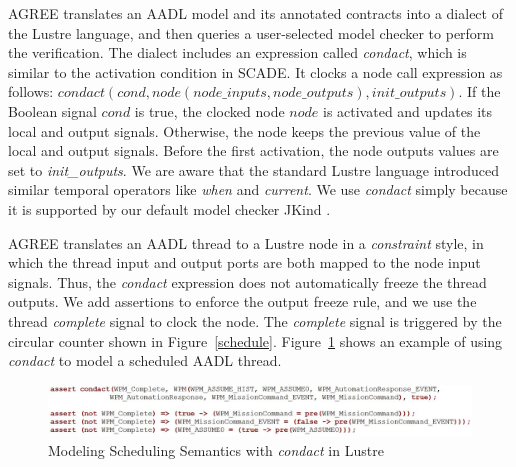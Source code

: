 AGREE translates an AADL model and its annotated contracts into a dialect \cite{jkind} of the Lustre language, and then queries a user-selected model checker to perform the verification. The dialect includes an expression called \emph{condact}, which is similar to the activation condition in SCADE. It clocks a node call expression as follows: 
$
condact (cond, node(node\_inputs, node\_outputs), init\_outputs)
$.
If the Boolean signal $cond$ is true, the clocked node $node$ is activated and updates its local and output signals. Otherwise, the node keeps the previous value of the local and output signals. Before the first activation, the node outputs values are set to \emph{init\_outputs}.
We are aware that the standard Lustre language introduced similar temporal operators like \emph{when} and \emph{current}. We use \emph{condact} simply because it is supported by our default model checker JKind \cite{jkind}.

AGREE translates an AADL thread to a Lustre node in a \emph{constraint} style, in which the thread input and output ports are both mapped to the node input signals. Thus, the \emph{condact} expression does not automatically freeze the thread outputs. We add assertions to enforce the output freeze rule, and we use the thread \emph{complete} signal to clock the node. The \emph{complete} signal is triggered by the circular counter shown in Figure~\ref{schedule}. Figure~\ref{WPMlustre} shows an example of using \emph{condact} to model a scheduled AADL thread. 

\begin{figure}[t!]
\centering
\includegraphics[width=120mm]{lustreAsync5.jpg}
\caption{Modeling Scheduling Semantics with \emph{condact} in Lustre \label{WPMlustre}}
\end{figure}
  
